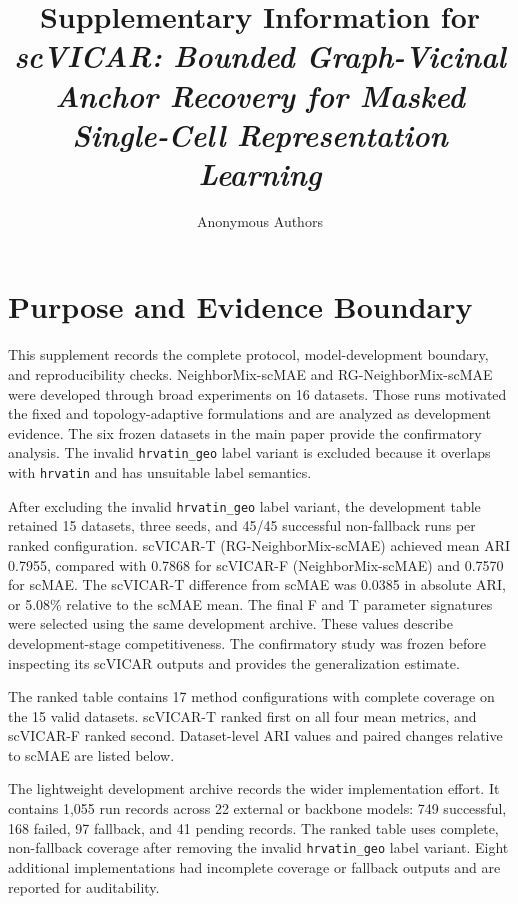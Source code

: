 \documentclass[11pt]{article}
\title{Supplementary Information for\\
\emph{scVICAR: Bounded Graph-Vicinal Anchor Recovery for Masked Single-Cell Representation Learning}}
\author{Anonymous Authors}
\date{}
\begin{document}
\maketitle

\section{Purpose and Evidence Boundary}

This supplement records the complete protocol, model-development boundary, and
reproducibility checks.  NeighborMix-scMAE and RG-NeighborMix-scMAE were
developed through broad experiments on 16 datasets. Those runs motivated the
fixed and topology-adaptive formulations and are analyzed as development
evidence. The six frozen datasets in the main paper provide the confirmatory
analysis. The invalid \texttt{hrvatin\_geo} label variant is excluded because
it overlaps with \texttt{hrvatin} and has unsuitable label semantics.

After excluding the invalid \texttt{hrvatin\_geo} label variant, the development
table retained 15 datasets, three seeds, and 45/45 successful non-fallback runs
per ranked configuration. scVICAR-T (RG-NeighborMix-scMAE) achieved mean ARI
0.7955, compared with 0.7868 for scVICAR-F (NeighborMix-scMAE) and 0.7570 for
scMAE. The scVICAR-T difference from scMAE was 0.0385 in absolute ARI, or
5.08\% relative to the scMAE mean. The final F and T parameter signatures were selected using the same
development archive. These values describe development-stage competitiveness.
The confirmatory study was frozen before inspecting its scVICAR outputs and
provides the generalization estimate.



The ranked table contains 17 method configurations with complete coverage on
the 15 valid datasets. scVICAR-T ranked first on all four mean metrics, and
scVICAR-F ranked second. Dataset-level ARI values and paired changes relative
to scMAE are listed below.



The lightweight development archive records the wider implementation effort.
It contains 1,055 run records across 22 external or backbone models: 749
successful, 168 failed, 97 fallback, and 41 pending records. The ranked table
uses complete, non-fallback coverage after removing the invalid
\texttt{hrvatin\_geo} label variant. Eight additional implementations had
incomplete coverage or fallback outputs and are reported for auditability.
\end{document}
